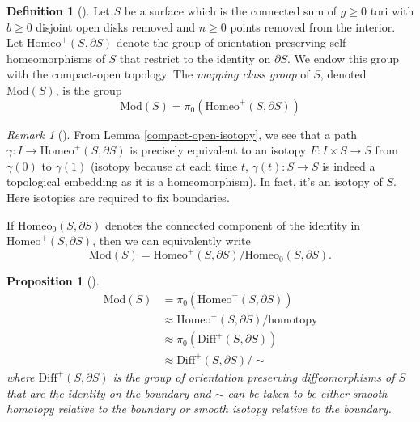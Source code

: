 \documentclass[reqno]{amsart}
\newtheorem{proposition}[theorem]{Proposition}
\theoremstyle{definition}
\newtheorem{definition}[theorem]{Definition}
\theoremstyle{remark}
\newtheorem*{remark}{Remark}
\newcommand{\Mod}{{\mathrm{Mod}}}
\newcommand{\Homeo}{{\mathrm{Homeo}}}
\begin{document}
\begin{definition}[]
    Let $S$ be a surface which is the connected sum of $g\ge 0$ 
    tori with $b \ge 0$ disjoint open disks removed and
    $n \ge 0$ points removed from the interior. Let
    $\Homeo^{+} \left( S, \partial S \right)$ denote the group
    of orientation-preserving self-homeomorphisms of $S$ that
    restrict to the identity on $\partial S$. We endow this
    group with the compact-open topology.
    The \textit{mapping class group} of  $S$, denoted
    $\Mod (S)$, is the group
    \[
    \Mod(S) = \pi_0 \left( \Homeo^{+} \left( S, \partial S
    \right) \right) 
    \] 


\begin{remark}[]
    From Lemma \ref{compact-open-isotopy}, we
    see that a path $\gamma \colon I \to 
    \Homeo^{+}\left( S, \partial S \right) $
    is precisely equivalent to an isotopy 
    $F \colon I \times S \to S$ from
    $\gamma(0)$ to $\gamma(1)$ (isotopy because at each
    time $t$, $\gamma(t) \colon S \to S$ is indeed a topological
    embedding as it is a homeomorphism). In fact, it's an isotopy
    of $S$. Here isotopies are required to fix
    boundaries.
\end{remark}





    If
    $\Homeo_0 (S, \partial S)$ denotes the connected component of
    the identity in $\Homeo^{+}\left( S, \partial S \right) $, then
    we can equivalently write
    \[
    \Mod (S) = \Homeo^{+} \left( S, \partial S \right) /
    \Homeo_0 \left( S, \partial S \right) .
    \] 
\end{definition}

\begin{proposition}[]
    \begin{align*}
        \Mod (S) 
        &= \pi_0 \left( \Homeo^{+} \left( S, \partial S \right) 
        \right) \\
        &\approx \Homeo^{+}\left( S, \partial S \right) /
        \text{homotopy}\\
        &\approx \pi_0 \left( \mathrm{Diff}^{+} \left( 
        S, \partial S \right)  \right) \\
        &\approx \textrm{Diff}^{+}\left( S, \partial S \right) /
        \sim
    \end{align*}
    where $\mathrm{Diff}^{+}\left( S, \partial S \right) $ is the group of
    orientation preserving diffeomorphisms of $S$ that are the
    identity on the boundary and $\sim$ can be taken to be either
    smooth homotopy relative to the boundary or smooth isotopy relative to the
    boundary.
\end{proposition}
\end{document}
